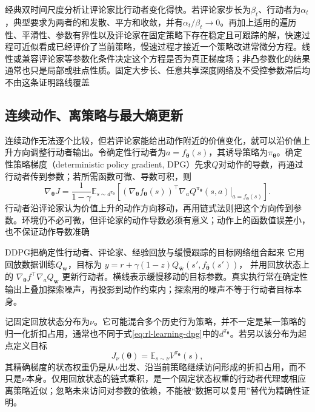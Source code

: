 经典双时间尺度分析让评论家比行动者变化得快。若评论家步长为$\beta_t$、行动者为$\alpha_t$，典型要求为两者的和发散、平方和收敛，并有$\alpha_t/\beta_t\to0$。再加上适用的遍历性、平滑性、参数有界性以及评论家在固定策略下存在稳定且可跟踪的解，快速过程可近似看成已经评价了当前策略，慢速过程才接近一个策略改进常微分方程。线性或兼容评论家等参数化条件决定这个方程是否为真正梯度场；非凸参数化的结果通常也只是局部或驻点性质。固定大步长、任意共享深度网络及不受控参数滞后均不由这条证明路线覆盖

\subsection{连续动作、离策略与最大熵更新}
\label{sec:rl-learning-continuous-soft}

连续动作无法逐个比较，但若评论家能给出动作附近的价值变化，就可以沿价值上升方向调整行动者输出。令确定性行动者为$a=f_{\bm\theta}(s)$，其诱导策略为$\pi_{\bm\theta}$。确定性策略梯度（deterministic policy gradient, DPG）先求$Q$对动作的导数，再通过行动者传到参数；若所需函数可微、导数可积，则
\begin{equation}
  \nabla_{\bm\theta}J
    =\frac1{1-\gamma}
       \mathbb E_{s\sim d^{\pi_{\bm\theta}}}
       \left[
         (\nabla_{\bm\theta}f_{\bm\theta}(s))^\top
         \left.\nabla_a Q^{\pi_{\bm\theta}}(s,a)
                    \right|_{a=f_{\bm\theta}(s)}
       \right].
  \label{eq:rl-learning-dpg}
\end{equation}
行动者沿评论家认为价值上升的动作方向移动，再用链式法则把这个方向传到参数。环境仍不必可微，但评论家的动作导数必须有意义；动作上的函数值误差小，也不保证动作导数准确

DDPG把确定性行动者、评论家、经验回放与缓慢跟踪的目标网络组合起来
它用回放数据训练$Q_{\bm w}$，目标为
$y=r+\gamma(1-z)Q_{\bar{\bm w}}(s',f_{\bar{\bm\theta}}(s'))$，
并用回放状态上的
$\nabla_{\bm\theta}f^\top\nabla_a Q_{\bm w}$
更新行动者。横线表示缓慢移动的目标参数。真实执行常在确定性输出上叠加探索噪声，再投影到动作约束内；探索用的噪声不等于行动者目标本身。

记固定回放状态分布为$\nu$。它可能混合多个历史行为策略，并不一定是某一策略的归一化折扣占用，通常也不同于式\eqref{eq:rl-learning-dpg}中的$d^{\pi_{\bm\theta}}$。若另以该分布为起点定义目标
\[
  J_\nu(\bm\theta)=\mathbb E_{s\sim\nu}V^{\pi_{\bm\theta}}(s),
\]
其精确梯度的状态权重仍是从$\nu$出发、沿当前策略继续访问形成的折扣占用，而不只是$\nu$本身。仅用回放状态的链式乘积，是一个固定状态权重的行动者代理或相应离策略近似；忽略未来访问对参数的依赖，不能被“数据可以复用”替代为精确性证明。

